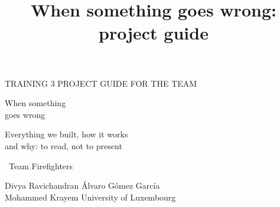 \documentclass[aspectratio=169,11pt,t]{beamer}
\title{When something goes wrong: project guide}
\begin{document}
{\darkslide
\begin{frame}[plain,c]
  \vspace*{-2mm}
  {\kickerfont\fontsize{8}{10}\selectfont\color{alert}TRAINING 3 \textbullet{} PROJECT GUIDE FOR THE TEAM}\par\vspace{4mm}
  \begin{minipage}{100mm}\raggedright
    {\headfont\fontsize{27}{32}\selectfont When something\\ goes wrong\par}\par\vspace{3mm}
    {\lightfont\fontsize{14}{18}\selectfont\color{soft}Everything we built, how it works\\ and why: to read, not to present\par}\par\vspace{8mm}
    {\headfont\small\color{alert}\faFireExtinguisher\ Team Firefighters\par}\vspace{1.2mm}
    {\small\color{soft}Divya Ravichandran \textbullet{} Álvaro Gómez García\\Mohammed Krayem \textbullet{} University of Luxembourg\par}
  \end{minipage}
\end{frame}
}
\end{document}
